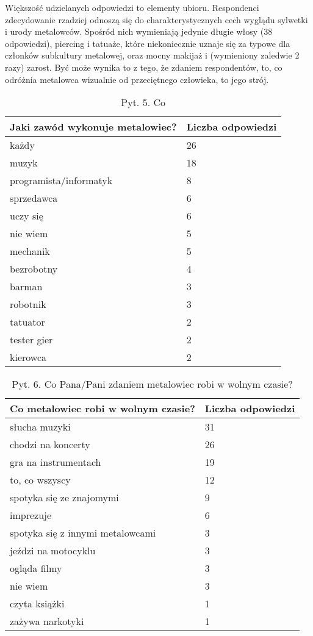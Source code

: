 \documentclass[12pt, a4paper, titlepage]{report}
\begin{document}
Większość udzielanych odpowiedzi to elementy ubioru. Respondenci zdecydowanie rzadziej odnoszą się do charakterystycznych cech wyglądu sylwetki i urody metalowców. Spośród nich wymieniają jedynie długie włosy (38 odpowiedzi), piercing i tatuaże, które niekoniecznie uznaje się za typowe dla członków subkultury metalowej, oraz mocny makijaż i (wymieniony zaledwie 2 razy) zarost. Być może wynika to z tego, że zdaniem respondentów, to, co odróżnia metalowca wizualnie od przeciętnego człowieka, to jego strój. 

\begin{table}
\begin{tabular}{ m{23em} | m{5em} } 
\textbf{Jaki zawód wykonuje metalowiec?} & Liczba odpowiedzi \\
\hline
każdy & 26 \\
muzyk & 18 \\
programista/informatyk & 8 \\
sprzedawca & 6 \\
uczy się & 6 \\
nie wiem & 5 \\
mechanik & 5 \\
bezrobotny & 4 \\
barman & 3 \\
robotnik & 3 \\
tatuator & 2 \\
tester gier & 2 \\
kierowca & 2 \\
\end{tabular} 
\caption{Pyt. 5. Co }
\label{table:3}
\end{table}

\begin{table}
\begin{tabular}{ m{23em} | m{5em} } 
\textbf{Co metalowiec robi w wolnym czasie?
} & Liczba odpowiedzi \\
\hline
słucha muzyki & 31 \\
chodzi na koncerty & 26 \\
gra na instrumentach & 19 \\
to, co wszyscy & 12 \\
spotyka się ze znajomymi & 9 \\
imprezuje & 6 \\
spotyka się z innymi metalowcami & 3 \\
jeździ na motocyklu & 3 \\
ogląda filmy & 3 \\
nie wiem & 3 \\
czyta książki & 1 \\
zażywa narkotyki & 1 \\
\end{tabular} 
\caption{Pyt. 6. Co Pana/Pani zdaniem metalowiec robi w wolnym czasie?}
\label{table:2}
\end{table}
\end{document}

